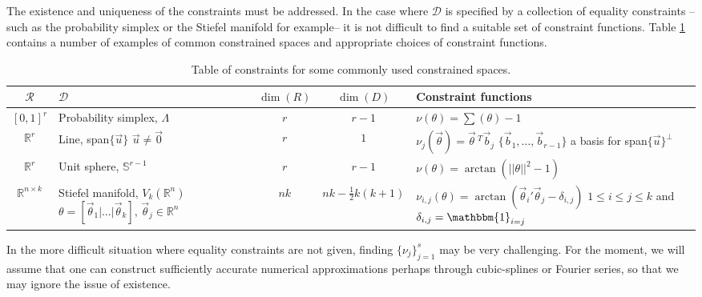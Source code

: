 \documentclass[10pt,fleqn]{article}
\DeclareMathOperator{\1}{\mathbbm{1}}
\begin{document}
The existence and uniqueness of the constraints must be addressed.  In the case where $\mathcal{D}$ is specified by a collection of equality constraints -- such as the probability simplex or the Stiefel manifold for example--  it is not difficult to find a suitable set of constraint functions. Table \ref{TABLE:Equality_constraints_examples} contains a number of examples of common constrained spaces and appropriate choices of constraint functions.
\renewcommand{\arraystretch}{1.5}
\begin{table}[h!]
\begin{center}
\begin{tabular}{| c | m{4 cm} | c | c | m{6cm} |}
\hline
$\mathcal{R}$ & $\mathcal{D}$ & $\dim(R)$ & $\dim(D)$ & Constraint functions \\
\hline
$[0,1]^r$ & Probability simplex, $\Lambda$ & $r$ & $r-1$ & $\nu(\theta) = \sum(\theta) -1$ \\
\hline
$\mathbb{R}^r$ & Line, span$\{\vec{u}\}$ \newline $\vec{u}\ne\vec{0}$ & $r$ & $1$ & $\nu_j(\vec{\theta}) = \vec{\theta}\,^T\vec{b}_j$ \newline $\{\vec{b}_1,\dots,\vec{b}_{r-1}\}$ a basis for span$\{\vec{u}\}^\perp$ \\
\hline
$\mathbb{R}^r$ & Unit sphere, $\mathbb{S}^{r-1}$ & $r$ & $r-1$ & $\nu(\theta) = \arctan(||\theta||^2 -1)$ \\
\hline
$\mathbb{R}^{n\times k}$ & Stiefel manifold, $V_k(\mathbb{R}^n)$ 
\newline $\theta = [\vec{\theta}_1 | \dots | \vec{\theta}_k], \, \vec{\theta}_j \in \mathbb{R}^n$ & $nk$ & $nk - \frac{1}{2}k(k+1)$ & $\nu_{i,j}(\theta) = \arctan( \vec{\theta}_i'\vec{\theta}_j- \delta_{i,j})$ \newline $1\le i \le j \le k$ and $\delta_{i,j} = \mathbbm{1}_{i=j}$ \\
\hline
\end{tabular}
\end{center}
\caption{Table of constraints for some commonly used constrained spaces.}
\label{TABLE:Equality_constraints_examples}
\end{table}

In the more difficult situation where equality constraints are not given, finding $\{\nu_j\}_{j=1}^s$ may be very challenging. For the moment, we will assume that one can construct sufficiently accurate numerical approximations perhaps through cubic-splines or Fourier series, so that we may ignore the issue of existence. 
\end{document}

